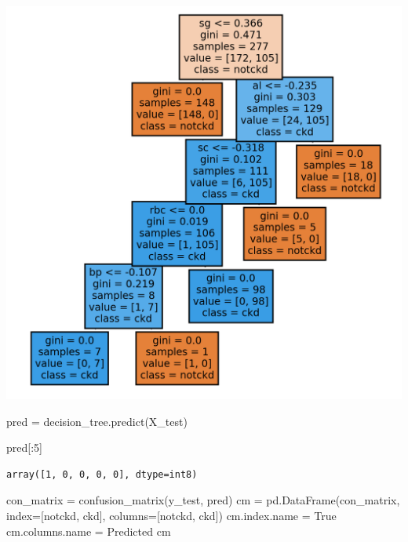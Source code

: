 \documentclass[
  11pt,
  letterpaper,
  DIV=11,
  numbers=noendperiod]{scrartcl}
\newenvironment{Shaded}{\begin{snugshade}}{\end{snugshade}}
\newcommand{\DecValTok}[1]{\textcolor[rgb]{0.68,0.00,0.00}{#1}}
\newcommand{\NormalTok}[1]{\textcolor[rgb]{0.00,0.23,0.31}{#1}}
\newcommand{\OperatorTok}[1]{\textcolor[rgb]{0.37,0.37,0.37}{#1}}
\newcommand{\StringTok}[1]{\textcolor[rgb]{0.13,0.47,0.30}{#1}}
\begin{document}
\includegraphics{assignment6111_files/figure-pdf/cell-58-output-2.png}

\begin{Shaded}
\begin{Highlighting}[]
\NormalTok{pred }\OperatorTok{=}\NormalTok{ decision\_tree.predict(X\_test)}

\NormalTok{pred[:}\DecValTok{5}\NormalTok{]}
\end{Highlighting}
\end{Shaded}

\begin{verbatim}
array([1, 0, 0, 0, 0], dtype=int8)
\end{verbatim}

\begin{Shaded}
\begin{Highlighting}[]
\NormalTok{con\_matrix }\OperatorTok{=}\NormalTok{ confusion\_matrix(y\_test, pred)}
\NormalTok{cm }\OperatorTok{=}\NormalTok{ pd.DataFrame(con\_matrix, index}\OperatorTok{=}\NormalTok{[}\StringTok{\textquotesingle{}notckd\textquotesingle{}}\NormalTok{, }\StringTok{\textquotesingle{}ckd\textquotesingle{}}\NormalTok{], columns}\OperatorTok{=}\NormalTok{[}\StringTok{\textquotesingle{}notckd\textquotesingle{}}\NormalTok{, }\StringTok{\textquotesingle{}ckd\textquotesingle{}}\NormalTok{])}
\NormalTok{cm.index.name }\OperatorTok{=} \StringTok{\textquotesingle{}True\textquotesingle{}}
\NormalTok{cm.columns.name }\OperatorTok{=} \StringTok{\textquotesingle{}Predicted\textquotesingle{}}
\NormalTok{cm}
\end{Highlighting}
\end{Shaded}
\end{document}
